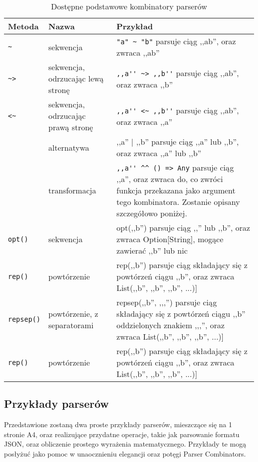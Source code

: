 \begin{table}[ch]
\begin{center}
\begin{tabular}{|l|l|p{7cm}|}
\hline
Metoda & Nazwa & Przykład \\ \hline
\verb|~| & sekwencja & \verb|"a" ~ "b"| parsuje ciąg ,,ab'', oraz zwraca ,,ab''\\
\verb|~>| & sekwencja, odrzucając lewą stronę & \verb|,,a'' ~> ,,b''| parsuje ciąg ,,ab'', oraz zwraca ,,b''\\
\verb|<~| & sekwencja, odrzucając prawą stronę & \verb|,,a'' <~ ,,b''| parsuje ciąg ,,ab'', oraz zwraca ,,a''\\
\verb\|\ & alternatywa & ,,a'' | ,,b'' parsuje ciąg ,,a'' lub ,,b'', oraz zwraca ,,a'' lub ,,b''\\
\verb\^^\ & transformacja & \verb|,,a'' ^^ () => Any| parsuje ciąg ,,a'', oraz zwraca do, co zwróci funkcja przekazana jako argument tego kombinatora. Zostanie opisany szczegółowo poniżej. \\
\verb|opt()| & sekwencja & opt(,,b'') parsuje ciąg ,,'' lub ,,b'', oraz zwraca Option[String], mogące zawierać ,,b'' lub nic\\
\verb|rep()| & powtórzenie & rep(,,b'') parsuje ciąg składający się z powtórzeń ciągu ,,b'', oraz zwraca List(,,b'', ,,b'', ,,b'', ...)]\\
\verb|repsep()| & powtórzenie, z separatorami & repsep(,,b'', ,,,'') parsuje ciąg składający się z powtórzeń ciągu ,,b'' oddzielonych znakiem ,,,'', oraz zwraca List(,,b'', ,,b'', ,,b'', ...)]\\
\verb|rep()| & powtórzenie & rep(,,b'') parsuje ciąg składający się z powtórzeń ciągu ,,b'', oraz zwraca List(,,b'', ,,b'', ,,b'', ...)]\\ \hline
\end{tabular}
\end{center}
\caption{Dostępne podstawowe kombinatory parserów}
\label{combinators_table}
\end{table}

\subsection{Przykłady parserów}
Przedstawione zostaną dwa proste przykłady parserów, mieszczące się na 1 stronie A4, oraz realizujące przydatne operacje, 
takie jak parsowanie formatu JSON, oraz obliczenie prostego wyrażenia matematycznego. Przykłady te mogą posłyżuć jako pomoc w unaocznieniu elegancji
oraz potęgi Parser Combinators.

